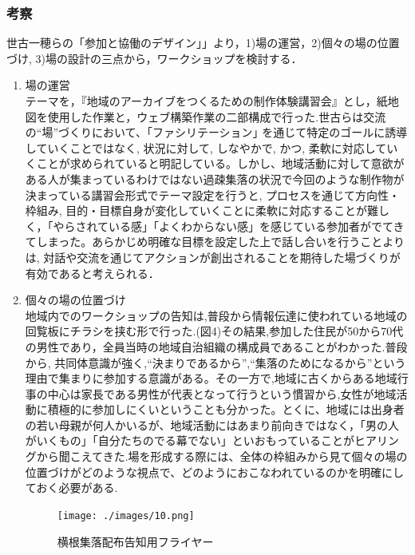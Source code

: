 \documentclass[a4paper]{jsarticle}
\begin{document}
\subsubsection{考察}
世古一穂らの「参加と協働のデザイン」」\cite{13}より，1)場の運営，2)個々の場の位置づけ, 3)場の設計の三点から，ワークショップを検討する．\\
\begin{enumerate}
\item 場の運営\\
テーマを，『地域のアーカイブをつくるための制作体験講習会』とし，紙地図を使用した作業と，ウェブ構築作業の二部構成で行った.世古ら\cite{13}は交流の“場”づくりにおいて、｢ファシリテーション｣ を通じて特定のゴールに誘導していくことではなく, 状況に対して, しなやかで, かつ, 柔軟に対応していくことが求められていると明記している。しかし、地域活動に対して意欲がある人が集まっているわけではない過疎集落の状況で今回のような制作物が決まっている講習会形式でテーマ設定を行うと, プロセスを通じて方向性・枠組み, 目的・目標自身が変化していくことに柔軟に対応することが難しく，「やらされている感」「よくわからない感」を感じている参加者がでてきてしまった。あらかじめ明確な目標を設定した上で話し合いを行うことよりは, 対話や交流を通じてアクションが創出されることを期待した場づくりが有効であると考えられる．\\

\item  個々の場の位置づけ\\
地域内でのワークショップの告知は,普段から情報伝達に使われている地域の回覧板にチラシを挟む形で行った.(図4)その結果,参加した住民が50から70代の男性であり，全員当時の地域自治組織の構成員であることがわかった.普段から, 共同体意識が強く,“決まりであるから”,“集落のためになるから”という理由で集まりに参加する意識がある。その一方で,地域に古くからある地域行事の中心は家長である男性が代表となって行うという慣習から,女性が地域活動に積極的に参加しにくいということも分かった。とくに、地域には出身者の若い母親が何人かいるが、地域活動にはあまり前向きではなく，「男の人がいくもの」「自分たちのでる幕でない」といおもっていることがヒアリングから聞こえてきた.場を形成する際には、全体の枠組みから見て個々の場の位置づけがどのような視点で、どのようにおこなわれているのかを明確にしておく必要がある.\\
\begin{figure}[H]
  \begin{center}
    \texttt{[image: ./images/10.png]}
    \caption{横根集落配布告知用フライヤー}
    \label{fig:tmu_hino}
  \end{center}
\end{figure}


\end{enumerate}
\end{document}
